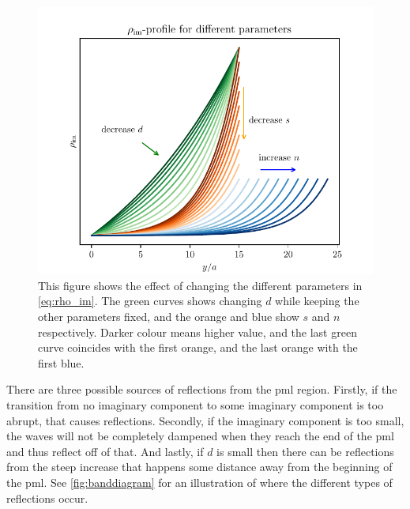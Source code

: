 \begin{figure}[htpb]
	\centering
	\includegraphics{chapters/methods/pml_profile.pdf}
	\caption{%
		This figure shows the effect of changing the different parameters in
		\cref{eq:rho_im}.
		The green curves shows changing $d$ while keeping the other parameters
		fixed, and the orange and blue show $s$ and $n$ respectively.
		Darker colour means higher value, and the last green curve coincides
		with the first orange, and the last orange with the first blue.
	}%
	\label{fig:pml_profile}
\end{figure}

There are three possible sources of reflections from the \gls{pml} region.
Firstly, if the transition from no imaginary component to some imaginary
component is too abrupt, that causes reflections.
Secondly, if the imaginary component is too small, the waves will not be
completely dampened when they reach the end of the \gls{pml} and thus reflect
off of that.
And lastly, if $d$ is small then there can be reflections from the steep
increase that happens some distance away from the beginning of the \gls{pml}.
See \cref{fig:banddiagram} for an illustration of where the different types of
reflections occur.

